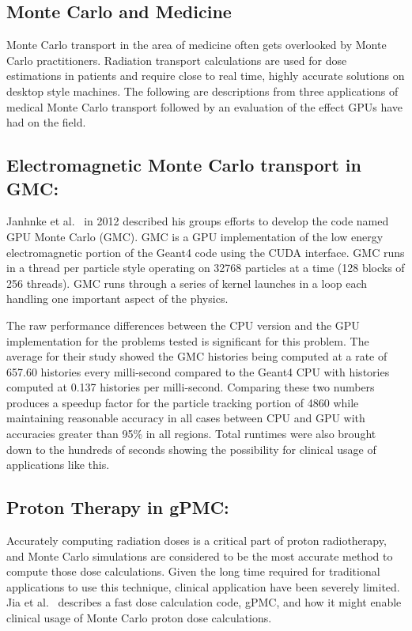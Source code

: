 \subsection{\textbf{Monte Carlo and Medicine}}

Monte Carlo transport in the area of medicine often gets overlooked by Monte Carlo practitioners.
%
Radiation transport calculations are used for dose estimations in patients and require close to real time, highly accurate solutions on desktop style machines.
%
The following are descriptions from three applications of medical Monte Carlo transport followed by an evaluation of the effect GPUs have had on the field.

\subsection*{ \textbf{Electromagnetic Monte Carlo transport in GMC}:}

Janhnke et al.~\cite{jahnke2012gmc} in 2012 described his groups efforts to develop the code named GPU Monte Carlo (GMC).
%
GMC is a GPU implementation of the low energy electromagnetic portion of the Geant4 code using the CUDA interface.
%
GMC runs in a thread per particle style operating on 32768 particles at a time (128 blocks of 256 threads).
%
GMC runs through a series of kernel launches in a loop each handling one important aspect of the physics.

The raw performance differences between the CPU version and the GPU implementation for the problems tested is significant for this problem.
%
The average for their study showed the GMC histories being computed at a rate of 657.60 histories every milli-second compared to the Geant4 CPU with histories computed at 0.137 histories per milli-second.
%
Comparing these two numbers produces a speedup factor for the particle tracking portion of 4860 while maintaining reasonable accuracy in all cases between CPU and GPU with accuracies greater than 95\% in all regions.
%
Total runtimes were also brought down to the hundreds of seconds showing the possibility for clinical usage of applications like this.~\cite{jahnke2012gmc}

\subsection*{\textbf{Proton Therapy in gPMC}:}

Accurately computing radiation doses is a critical part of proton radiotherapy, and Monte Carlo simulations are considered to be the most accurate method to compute those dose calculations.
%
Given the long time required for traditional applications to use this technique, clinical application have been severely limited.
%
Jia et al.~\cite{jia2012gpu} describes a fast dose calculation code, gPMC, and how it might enable clinical usage of Monte Carlo proton dose calculations.

